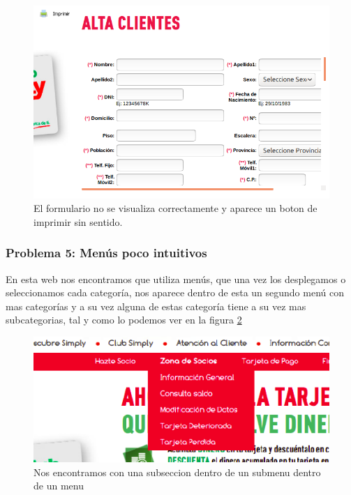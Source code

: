 \documentclass[a4paper,11pt]{article}
\begin{document}
\begin{figure}
 \centering
 \includegraphics[scale=0.5]{imprimiryformulario.png}
 \caption{El formulario no se visualiza correctamente y aparece un boton de imprimir sin sentido.}
 \label{fig:imprimiryformulario}
\end{figure}



\subsubsection{Problema 5: Menús poco intuitivos}
En esta web nos encontramos que utiliza menús, que una vez los desplegamos o seleccionamos cada categoría, nos aparece dentro de esta un segundo menú con mas categorías y a su vez alguna de estas categoría tiene a su vez mas subcategorias, tal y como lo podemos ver en la figura \ref{fig:subsubmenu}
\begin{figure}
 \centering
 \includegraphics[scale=0.5]{subsubmenu.png}
 \caption{Nos encontramos con una subseccion dentro de un submenu dentro de un menu}
 \label{fig:subsubmenu}
\end{figure}
\end{document}
